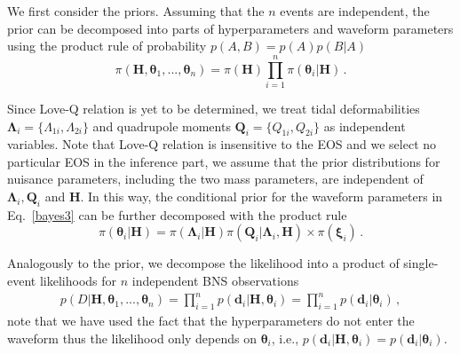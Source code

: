 \documentclass[a4paper,11pt]{article}
\begin{document}
We first consider the priors. Assuming that the $n$ events are independent, the prior can be decomposed into parts of hyperparameters and waveform parameters using the product rule of probability $p(A,B)=p(A)p(B|A)$
\begin{equation}
\label{bayes3}
\pi(\bm{H},\bm{\theta}_1,...,\bm{\theta}_n) = \pi(\bm{H}) \prod_{i=1}^n \pi(\bm{\theta}_i|\bm{H})\,.
\end{equation}

Since Love-Q relation is yet to be determined, we treat tidal deformabilities $\bm{\Lambda}_i=\{\Lambda_{1i},\Lambda_{2i}\}$ and quadrupole moments $\bm{Q}_i=\{Q_{1i},Q_{2i}\}$ as independent variables. Note that Love-Q relation is insensitive to the EOS and we select no particular EOS in the inference part, we assume that the prior distributions for nuisance parameters, including the two mass parameters, are independent of $\bm{\Lambda}_i, \bm{Q}_i$ and $\bm{H}$. 
In this way, the conditional prior for the waveform parameters in Eq.~\eqref{bayes3} can be further decomposed with the product rule
\begin{equation}
\label{prior}
\pi(\bm{\theta}_i|\bm{H})=\pi(\bm{\Lambda}_i|\bm{H})\pi(\bm{Q}_i|\bm{\Lambda}_i,\bm{H})\times\pi(\bm{\xi}_i)\,.
\end{equation}

Analogously to the prior, we decompose the likelihood into a product of single-event likelihoods for $n$ independent BNS observations
\begin{subequations}
\begin{align}
p(D|\bm{H},\bm{\theta}_1,...,\bm{\theta}_n)=\prod_{i=1}^{n}p(\bm{d}_i|\bm{H},\bm{\theta}_i)=\prod_{i=1}^{n}p(\bm{d}_i|\bm{\theta}_i)\,,
\end{align}   
\end{subequations}
note that we have used the fact that the hyperparameters do not enter the waveform thus the likelihood only depends on $\bm{\theta}_i$, i.e., $p(\bm{d}_i|\bm{H},\bm{\theta}_i)=p(\bm{d}_i|\bm{\theta}_i)$.
\end{document}
